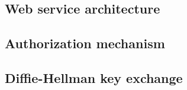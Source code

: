 \subsection{Web service architecture}\label{subsec:web-service-architecture}


\subsection{Authorization mechanism}\label{subsec:authorization-mechanism}


\subsection{Diffie-Hellman key exchange}\label{subsec:diffie-hellman-key-exchange}
